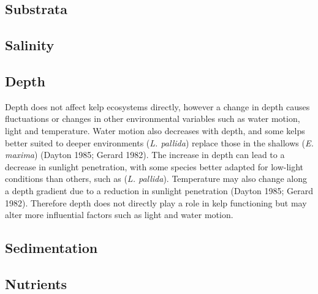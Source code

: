 \documentclass[]{article}
\begin{document}
\hypertarget{substrata}{%
\subsection{Substrata}\label{substrata}}

\hypertarget{salinity}{%
\subsection{Salinity}\label{salinity}}

\hypertarget{depth}{%
\subsection{Depth}\label{depth}}

Depth does not affect kelp ecosystems directly, however a change in
depth causes fluctuations or changes in other environmental variables
such as water motion, light and temperature. Water motion also decreases
with depth, and some kelps better suited to deeper environments
(\emph{L. pallida}) replace those in the shallows (\emph{E. maxima})
(Dayton 1985; Gerard 1982). The increase in depth can lead to a decrease
in sunlight penetration, with some species better adapted for low-light
conditions than others, such as (\emph{L. pallida}). Temperature may
also change along a depth gradient due to a reduction in sunlight
penetration (Dayton 1985; Gerard 1982). Therefore depth does not
directly play a role in kelp functioning but may alter more influential
factors such as light and water motion.

\hypertarget{sedimentation}{%
\subsection{Sedimentation}\label{sedimentation}}

\hypertarget{nutrients}{%
\subsection{Nutrients}\label{nutrients}}
\end{document}
